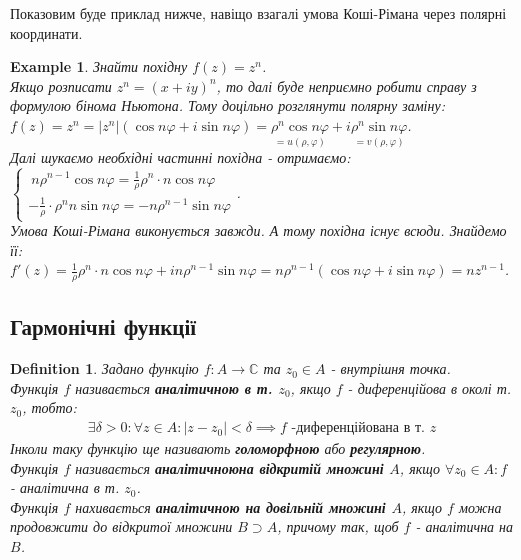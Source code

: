 \documentclass[a4paper, 10pt]{article}
\theoremstyle{theoremdd}
\theoremstyle{theoremdd}
\newtheorem{definition}[theorem]{Definition}
\theoremstyle{theoremdd}
\theoremstyle{theoremdd}
\newtheorem{example}[theorem]{Example}
\theoremstyle{theoremdd}
\theoremstyle{theoremdd}
\theoremstyle{theoremdd}
\theoremstyle{theoremdd}
\begin{document}
Показовим буде приклад нижче, навіщо взагалі умова Коші-Рімана через полярні координати.

\begin{example}
Знайти похідну $f(z)=z^n$.\\
Якщо розписати $z^n = (x+iy)^n$, то далі буде неприємно робити справу з формулою бінома Ньютона. Тому доцільно розглянути полярну заміну:\\
$f(z) = z^n = |z^n|(\cos n \varphi + i\sin n \varphi) = \underset{=u(\rho, \varphi)}{\rho^n \cos n\varphi}  + i \underset{=v(\rho, \varphi)}{\rho^n \sin n\varphi}$.\\
Далі шукаємо необхідні частинні похідна - отримаємо:\\
$\begin{cases}
		\displaystyle\ n \rho^{n-1} \cos n\varphi = \frac{1}{\rho} \rho^n \cdot n \cos n \varphi \\
		\displaystyle -\frac{1}{\rho} \cdot \rho^n n \sin n \varphi =- n \rho^{n-1} \sin n \varphi
	\end{cases}$.\\
	Умова Коші-Рімана виконується завжди. А тому похідна існує всюди. Знайдемо її:\\
	$f'(z)= \displaystyle \frac{1}{\rho} \rho^n \cdot n \cos n \varphi + i n \rho^{n-1} \sin n \varphi = n\rho^{n-1}\left(\cos n\varphi + i \sin n\varphi  \right) = nz^{n-1}$.
\end{example}
	
\subsection{Гармонічні функції}
\begin{definition}
Задано функцію $f: A \to \mathbb{C}$ та $z_0 \in A$ - внутрішня точка.\\
Функція $f$ називається \textbf{аналітичною в т. $z_0$}, якщо $f$ - диференційова в околі т. $z_0$, тобто:
\begin{align*}
	\exists \delta > 0: \forall z \in A: |z-z_0|<\delta \implies f \text{ -диференційована в т. } z
\end{align*}
Інколи таку функцію ще називають \textbf{голоморфною} або \textbf{регулярною}.\\
Функція $f$ називається \textbf{аналітичноюна відкритій множині $A$}, якщо $\forall z_0 \in A: f$ - аналітична в т. $z_0$.\\
Функція $f$ нахивається \textbf{аналітичною на довільній множині $A$}, якщо $f$ можна продовжити до відкритої множини $B \supset A$, причому так, щоб $f$ - аналітична на $B$.
\end{definition}
\end{document}

